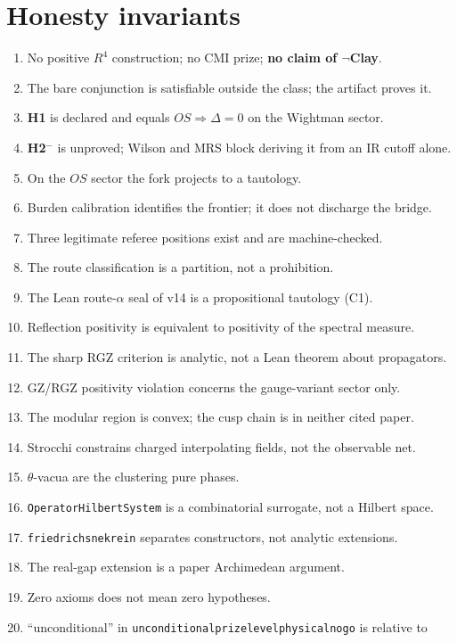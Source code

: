 \documentclass[11pt,a4paper]{article}
\def\R{R}\def\N{N}\def\Q{Q}\def\Z{Z}\def\Class{C}\def\OS{OS}\def\Gap{Gap}%
\theoremstyle{plain}
\theoremstyle{definition}
\theoremstyle{remark}
\newcommand{\R}{\mathbb{R}}\newcommand{\N}{\mathbb{N}}\newcommand{\Q}{\mathbb{Q}}
\newcommand{\Z}{\mathbb{Z}}\newcommand{\Spec}{\operatorname{Spec}}
\newcommand{\OS}{\mathrm{OS}}\newcommand{\Gap}{\mathrm{Gap}}
\newcommand{\Class}{\mathcal{C}}\newcommand{\Htot}{\mathcal{H}}
\renewcommand{\_}{\oldunderscore\allowbreak}
\newcommand{\Lean}[1]{\texttt{\small #1}}
\begin{document}
\section{Honesty invariants}
\begin{enumerate}[label=\textbf{I\arabic*.},leftmargin=30pt,itemsep=1pt]
\item No positive $\R^4$ construction; no CMI prize; \textbf{no claim of $\neg$Clay}.
\item The bare conjunction is satisfiable outside the class; the artifact proves it.
\item \textbf{H1} is declared and equals $\OS\Rightarrow\Delta=0$ on the Wightman sector.
\item \textbf{H2$^-$} is unproved; Wilson and MRS block deriving it from an IR cutoff alone.
\item On the $\OS$ sector the fork projects to a tautology.
\item Burden calibration identifies the frontier; it does not discharge the bridge.
\item Three legitimate referee positions exist and are machine-checked.
\item The route classification is a partition, not a prohibition.
\item The Lean route-$\alpha$ seal of v14 is a propositional tautology (C1).
\item Reflection positivity is equivalent to positivity of the spectral measure.
\item The sharp RGZ criterion is analytic, not a Lean theorem about propagators.
\item GZ/RGZ positivity violation concerns the gauge-variant sector only.
\item The modular region is convex; the cusp chain is in neither cited paper.
\item Strocchi constrains charged interpolating fields, not the observable net.
\item $\theta$-vacua are the clustering pure phases.
\item \Lean{OperatorHilbertSystem} is a combinatorial surrogate, not a Hilbert space.
\item \Lean{friedrichs\_ne\_krein} separates constructors, not analytic extensions.
\item The real-gap extension is a paper Archimedean argument.
\item Zero axioms does not mean zero hypotheses.
\item ``unconditional'' in \Lean{unconditional\_prize\_level\_physical\_no\_go} is relative to

\end{enumerate}
\end{document}
